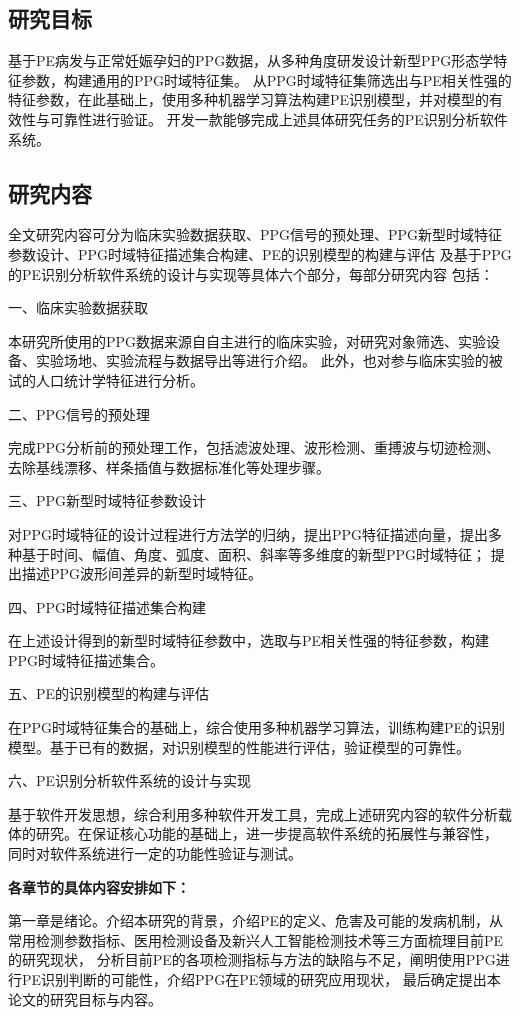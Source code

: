 \subsection{研究目标}
基于PE病发与正常妊娠孕妇的PPG数据，从多种角度研发设计新型PPG形态学特征参数，构建通用的PPG时域特征集。
从PPG时域特征集筛选出与PE相关性强的特征参数，在此基础上，使用多种机器学习算法构建PE识别模型，并对模型的有效性与可靠性进行验证。
开发一款能够完成上述具体研究任务的PE识别分析软件系统。
\subsection{研究内容}
全文研究内容可分为临床实验数据获取、PPG信号的预处理、PPG新型时域特征参数设计、PPG时域特征描述集合构建、PE的识别模型的构建与评估
及基于PPG的PE识别分析软件系统的设计与实现等具体六个部分，每部分研究内容
包括：

一、临床实验数据获取

本研究所使用的PPG数据来源自自主进行的临床实验，对研究对象筛选、实验设备、实验场地、实验流程与数据导出等进行介绍。
此外，也对参与临床实验的被试的人口统计学特征进行分析。

二、PPG信号的预处理

完成PPG分析前的预处理工作，包括滤波处理、波形检测、重搏波与切迹检测、去除基线漂移、样条插值与数据标准化等处理步骤。

三、PPG新型时域特征参数设计

对PPG时域特征的设计过程进行方法学的归纳，提出PPG特征描述向量，提出多种基于时间、幅值、角度、弧度、面积、斜率等多维度的新型PPG时域特征；
提出描述PPG波形间差异的新型时域特征。

四、PPG时域特征描述集合构建

在上述设计得到的新型时域特征参数中，选取与PE相关性强的特征参数，构建PPG时域特征描述集合。

五、PE的识别模型的构建与评估

在PPG时域特征集合的基础上，综合使用多种机器学习算法，训练构建PE的识别模型。基于已有的数据，对识别模型的性能进行评估，验证模型的可靠性。

六、PE识别分析软件系统的设计与实现

基于软件开发思想，综合利用多种软件开发工具，完成上述研究内容的软件分析载体的研究。在保证核心功能的基础上，进一步提高软件系统的拓展性与兼容性，
同时对软件系统进行一定的功能性验证与测试。

\textbf{各章节的具体内容安排如下：}

第一章是绪论。介绍本研究的背景，介绍PE的定义、危害及可能的发病机制，从常用检测参数指标、医用检测设备及新兴人工智能检测技术等三方面梳理目前PE的研究现状，
分析目前PE的各项检测指标与方法的缺陷与不足，阐明使用PPG进行PE识别判断的可能性，介绍PPG在PE领域的研究应用现状，
最后确定提出本论文的研究目标与内容。

